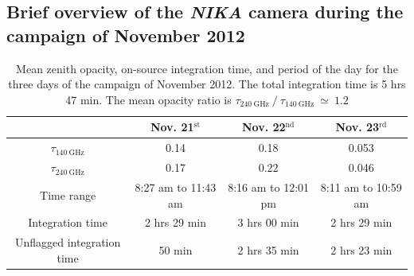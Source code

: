 \subsection{Brief overview of the {\it NIKA} camera during the campaign of November 2012}
\label{sec:run_overview}
\begin{table}
	\begin{center}
	\begin{tabular}{cccc}
	 \hline
         \hline
	& Nov. 21$^{\mathrm{st}}$ & Nov. 22$^{\mathrm{nd}}$ & Nov. 23$^{\mathrm{rd}}$\\
	\hline
	$\tau_{140 \ \mathrm{GHz}}$ & 0.14 & 0.18 & 0.053 \\
	$\tau_{240 \ \mathrm{GHz}}$ & 0.17 & 0.22 & 0.046 \\
	Time range & 8:27 am to 11:43 am & 8:16 am to 12:01 pm & 8:11 am to 10:59 am \\
	Integration time & 2 hrs 29 min & 3 hrs 00 min & 2 hrs 29 min \\
	Unflagged integration time & 50 min & 2 hrs 35 min & 2 hrs 23 min \\
	\hline
	\end{tabular}
	\end{center}
	\caption{Mean zenith opacity, on-source integration time, and period of the day for the three days of the campaign of November 2012. The total integration time is 5 hrs 47 min. The mean opacity ratio is $\tau_{240~\mathrm{GHz}}~/~\tau_{140~\mathrm{GHz}}~\simeq~1.2$}
	\label{tab:table_obs}
	\end{table}

